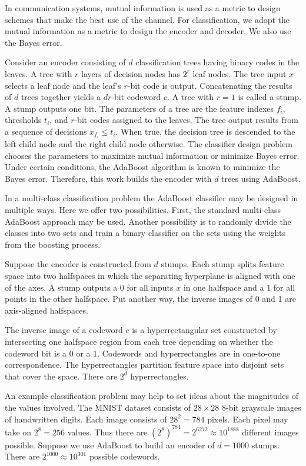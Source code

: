 \documentclass{article}
\begin{document}
In communication systems, mutual information is used as a metric to design schemes that make the best use of the channel.  For classification, we adopt the mutual information as a metric to design the encoder and decoder.  We also use the Bayes error.

Consider an encoder consisting of $d$ classification trees having binary codes in the leaves.  A tree with $r$ layers of decision nodes has $2^r$ leaf nodes.  The tree input $x$ selects a leaf node and the leaf's $r$-bit code is output.  Concatenating the results of $d$ trees together yields a $dr$-bit codeword $c$.   A tree with $r=1$ is called a stump.  A stump outputs one bit.  The parameters of a tree are the feature indexes $f_i$, thresholds $t_i$, and $r$-bit codes assigned to the leaves.  The tree output results from a sequence of decisions $x_{f_i} \leq t_i$.  When true, the decision tree is descended to the left child node and the right child node otherwise.  The classifier design problem chooses the parameters to maximize mutual information or minimize Bayes error.  Under certain conditions, the AdaBoost algorithm is known to minimize the Bayes error.  Therefore, this work builds the encoder with $d$ trees using AdaBoost.

In a multi-class classification problem the AdaBoost classifier may be designed in multiple ways.  Here we offer two possibilities.  First, the standard multi-class AdaBoost approach may be used.  Another possibility is to randomly divide the classes into two sets and train a binary classifier on the sets using the weights from the boosting process.

Suppose the encoder is constructed from $d$ stumps.  Each stump splits feature space into two halfspaces in which the separating hyperplane is aligned with one of the axes.  A stump outputs a 0 for all inputs $x$ in one halfspace and a 1 for all points in the other halfspace.  Put another way, the inverse images of 0 and 1 are axis-aligned halfspaces.

The inverse image of a codeword $c$ is a hyperrectangular set constructed by intersecting one halfspace region from each tree depending on whether the codeword bit is a 0 or a 1.  Codewords and hyperrectangles are in one-to-one correspondence.  The hyperrectangles partition feature space into disjoint sets that cover the space.  There are $2^d$ hyperrectangles.

An example classification problem may help to set ideas about the magnitudes of the values involved.  The MNIST dataset consists of $28 \times 28$ 8-bit grayscale images of handwritten digits.  Each image consists of $28^2=784$ pixels.  Each pixel may take on $2^8=256$ values.  Thus there are $(2^8)^784 = 2^{6272} \approx 10^{1888}$ different images possible.  Suppose we use AdaBoost to build an encoder of $d=1000$ stumps.  There are $2^{1000} \approx 10^{301}$ possible codewords.
\end{document}
